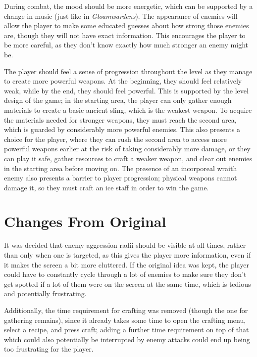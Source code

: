 \documentclass[10pt]{article}
\begin{document}
During combat, the mood should be more energetic, which can be supported by a change in music (just like in \textit{Gloamwardens}).
The appearance of enemies will allow the player to make some educated guesses about how strong those enemies are,
though they will not have exact information. This encourages the player to be more careful, as they don't know exactly
how much stronger an enemy might be.

The player should feel a sense of progression throughout the level as they manage to create more powerful weapons.
At the beginning, they should feel relatively weak, while by the end, they should feel powerful.
This is supported by the level design of the game; in the starting area, the player can only gather enough materials
to create a basic ancient sling, which is the weakest weapon. To acquire the materials needed for stronger weapons,
they must reach the second area, which is guarded by considerably more powerful enemies. This also presents a choice
for the player, where they can rush the second area to access more powerful weapons earlier at the risk of taking
considerably more damage, or they can play it safe, gather resources to craft a weaker weapon, and clear out enemies
in the starting area before moving on. The presence of an incorporeal wraith enemy also presents a barrier to player
progression; physical weapons cannot damage it, so they must craft an ice staff in order to win the game.

\section{Changes From Original}

It was decided that enemy aggression radii should be visible at all times, rather than only when one is targeted,
as this gives the player more information, even if it makes the screen a bit more cluttered. If the original idea
was kept, the player could have to constantly cycle through a lot of enemies to make sure they don't get spotted
if a lot of them were on the screen at the same time, which is tedious and potentially frustrating.

Additionally, the time requirement for crafting was removed (though the one for gathering remains), since it already
takes some time to open the crafting menu, select a recipe, and press craft; adding a further time requirement on top
of that which could also potentially be interrupted by enemy attacks could end up being too frustrating for the player.
\end{document}
